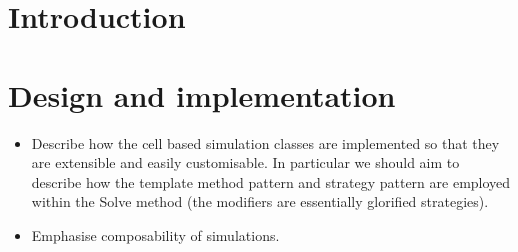 \documentclass[superscriptaddress, a4paper]{article}
\begin{document}
\section{Introduction}
\label{sec:introduction}



\section{Design and implementation}
\label{sec:design and implementation}

\begin{itemize}
 \item Describe how the cell based simulation classes are implemented so that they are extensible and easily customisable. In particular we should aim to describe how the template method pattern and strategy pattern are employed within the Solve method (the modifiers are essentially glorified strategies).
 \item Emphasise composability of simulations. 
\end{itemize}
\end{document}
